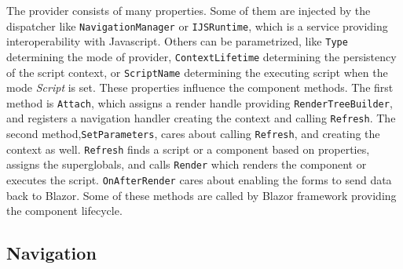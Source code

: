 The provider consists of many properties.
Some of them are injected by the dispatcher like \texttt{NavigationManager} or \texttt{IJSRuntime}, which is a service providing interoperability with Javascript.
Others can be parametrized, like \texttt{Type} determining the mode of provider, \texttt{ContextLifetime} determining the persistency of the script context, or \texttt{ScriptName} determining the executing script when the mode \textit{Script} is set.
These properties influence the component methods.
The first method is \texttt{Attach}, which assigns a render handle providing \texttt{RenderTreeBuilder}, and registers a navigation handler creating the context and calling \texttt{Refresh}.
The second method,\texttt{SetParameters}, cares about calling \texttt{Refresh}, and creating the context as well.
\texttt{Refresh} finds a script or a component based on properties, assigns the superglobals, and calls \texttt{Render} which renders the component or executes the script.
\texttt{OnAfterRender} cares about enabling the forms to send data back to Blazor.
Some of these methods are called by Blazor framework providing the component lifecycle.

\subsection{Navigation}

